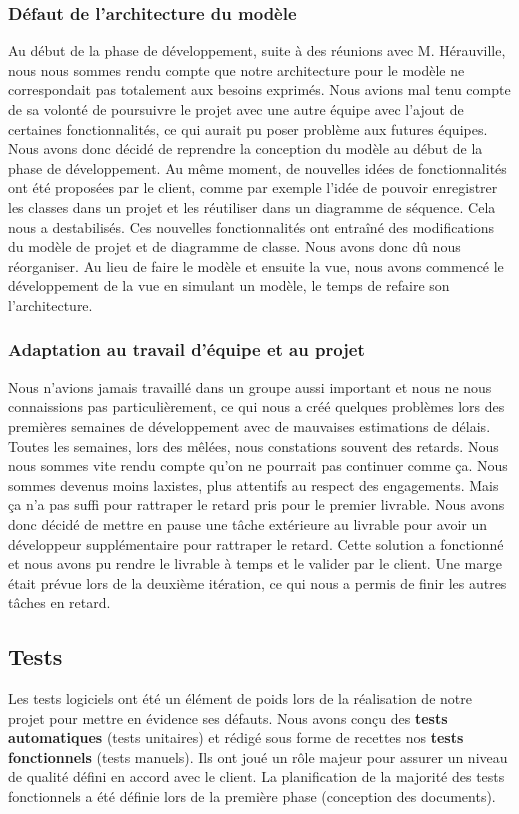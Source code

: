 \documentclass[hidelinks, 10pt,a4paper]{article}
\begin{document}
      \subsubsection{Défaut de l'architecture du modèle}
	Au début de la phase de développement, suite à des réunions avec M. Hérauville, nous nous sommes rendu compte 
	que notre architecture pour le modèle ne correspondait pas totalement aux besoins exprimés. 
	Nous avions mal tenu compte de sa volonté de poursuivre le projet avec 
	une autre équipe avec l'ajout de certaines fonctionnalités, ce qui aurait pu poser problème aux futures équipes. Nous avons donc décidé de
	reprendre la conception du modèle au début de la phase de développement. Au même moment, de nouvelles idées de fonctionnalités ont été proposées
	par le client, comme par exemple l'idée de pouvoir enregistrer les classes dans un projet et les réutiliser dans un diagramme de séquence. 
	Cela nous a destabilisés.
	Ces nouvelles fonctionnalités ont entraîné des modifications du modèle de projet et de diagramme de classe.
	Nous avons donc dû nous réorganiser. Au lieu de faire le modèle et ensuite la vue, nous avons commencé le développement de la vue
	en simulant un modèle, le temps de refaire son l'architecture. 

      \subsubsection{Adaptation au travail d'équipe et au projet}
	Nous n'avions jamais travaillé dans un groupe aussi important et nous ne nous connaissions 
	pas particulièrement, ce qui nous a créé quelques problèmes
	lors des premières semaines de développement avec de mauvaises estimations de délais.
	Toutes les semaines, lors des mêlées, nous constations souvent des retards. Nous nous sommes vite rendu compte qu'on ne pourrait
	pas continuer comme ça.
	Nous sommes devenus moins laxistes, plus attentifs au respect des engagements. Mais ça n'a pas suffi pour rattraper le retard pris pour le premier livrable. 
	Nous avons donc décidé de mettre en pause une tâche extérieure au livrable pour avoir un développeur supplémentaire pour rattraper le retard.
	Cette solution a fonctionné et nous avons pu rendre le livrable à temps et le valider par le client. Une marge était prévue lors de la deuxième
	itération, ce qui nous a permis de finir les autres tâches en retard.
      
  \subsection{Tests}
    Les tests logiciels ont été un élément de poids lors de la réalisation de notre projet pour mettre en évidence ses défauts.
    Nous avons conçu des \textbf{tests automatiques} (tests unitaires) et rédigé sous forme de recettes nos \textbf{tests fonctionnels} (tests manuels). 
    Ils ont joué un rôle majeur pour assurer un niveau de qualité défini en accord avec le client.\newline  
    La planification de la majorité des tests fonctionnels a été définie lors de la première phase (conception des documents).  \newline
    
\end{document}
